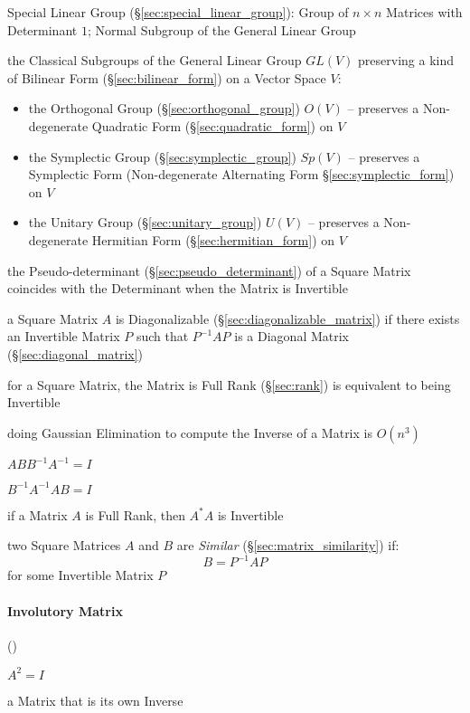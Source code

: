 \fist Special Linear Group (\S\ref{sec:special_linear_group}): Group of $n
\times n$ Matrices with Determinant $1$; Normal Subgroup of the General Linear
Group

the Classical Subgroups of the General Linear Group $GL(V)$ preserving a kind
of Bilinear Form (\S\ref{sec:bilinear_form}) on a Vector Space $V$:
\begin{itemize}
  \item the Orthogonal Group (\S\ref{sec:orthogonal_group}) $O(V)$ -- preserves
    a Non-degenerate Quadratic Form (\S\ref{sec:quadratic_form}) on $V$
  \item the Symplectic Group (\S\ref{sec:symplectic_group}) $Sp(V)$
    -- preserves a Symplectic Form (Non-degenerate Alternating Form
    \S\ref{sec:symplectic_form}) on $V$
  \item the Unitary Group (\S\ref{sec:unitary_group}) $U(V)$
    -- preserves a Non-degenerate Hermitian Form (\S\ref{sec:hermitian_form})
    on $V$
\end{itemize}

the Pseudo-determinant (\S\ref{sec:pseudo_determinant}) of a Square Matrix
coincides with the Determinant when the Matrix is Invertible

a Square Matrix $A$ is Diagonalizable (\S\ref{sec:diagonalizable_matrix}) if
there exists an Invertible Matrix $P$ such that $P^{-1}AP$ is a Diagonal Matrix
(\S\ref{sec:diagonal_matrix})

for a Square Matrix, the Matrix is Full Rank (\S\ref{sec:rank}) is
equivalent to being Invertible

doing Gaussian Elimination to compute the Inverse of a Matrix is $O(n^3)$

$ABB^{-1}A^{-1} = I$

$B^{-1}A^{-1}AB = I$

if a Matrix $A$ is Full Rank, then $A^*A$ is Invertible

two Square Matrices $A$ and $B$ are \emph{Similar}
(\S\ref{sec:matrix_similarity}) if:
\[
  B = P^{-1}AP
\]
for some Invertible Matrix $P$



\paragraph{Involutory Matrix} (\label{sec:involutory_matrix})\hfill

$A^2 = I$

a Matrix that is its own Inverse



